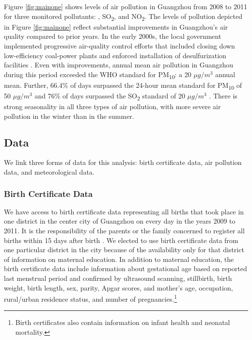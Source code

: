 Figure \ref{fig:mainone} shows levels of air pollution in Guangzhou from 2008 to 2011
for three monitored pollutants: \PARPMTEN, SO\textsubscript{2}, and NO\textsubscript{2}. The levels of pollution depicted in Figure \ref{fig:mainone} reflect
substantial improvements in Guangzhou's air quality compared to prior years. In the early 2000s, the local government implemented progressive air-quality
control efforts that included closing down low-efficiency coal-power plants and enforced installation
of desulfurization facilities \autocite{zhong_sciencepolicy_2013}. Even with improvements, annual mean air pollution in Guangzhou during this period exceeded the WHO standard for PM\textsubscript{10}: a 20 $\mu g/m^3$ annual mean.  Further, 66.4\% of days surpassed the 24-hour mean standard for PM\textsubscript{10} of 50 $\mu g/m^3$ and 76\% of days surpassed the SO\textsubscript{2} standard of 20 $\mu g/m^3$   \autocite{world_health_organization_ambient_2018}. There is strong
seasonality in all three types of air pollution, with more severe air
pollution in the winter than in the summer.

\subsection{Data\label{data}}

We link three forms of data for this analysis: birth certificate data,
air pollution data, and meteorological data.

\subsubsection{Birth Certificate Data \label{birth-certificate-data}}

We have access to birth certificate data representing all births that took place in one district in
the center city of Guangzhou on every day in the years 2009 to 2011. It is the responsibility of the parents or the family concerned
to register all births within 15 days after birth \autocite{lin_association_2015}.  We elected to use birth certificate data from one particular district in the city because of the availability only for that district of information on maternal education.
In addition to maternal education, the birth certificate data include information about gestational age based
on reported last menstrual period and confirmed by ultrasound scanning,
stillbirth, birth weight, birth length, sex, parity, Apgar scores, and
mother's age, occupation, rural/urban residence status, and number of
pregnancies.\footnote{Birth certificates also contain information on
  infant health and neonatal mortality.}  
